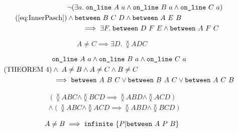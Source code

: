 \begin{equation}
  \tag{\ref{eq:InnerPasch}}
  \begin{split}
    &\Triangle{a}{A}{B}{C}\\ & \wedge \between{B}{C}{D} \wedge \between{A}{E}{B}\\ 
    &\qquad\implies \exists F.\; \between{D}{F}{E} \wedge \between{A}{F}{C}
  \end{split}
\end{equation}

\begin{equation}\label{eq:three}\tag{THEOREM~3}
A \neq C \implies \exists D.\; \between{A}{D}{C}
\end{equation}

\begin{equation}\label{eq:four}\tag{THEOREM~4}
  \begin{split}
    &\texttt{on\_line}\ A\ a \wedge \texttt{on\_line}\ B\ a \wedge \texttt{on\_line}\ C\ a \\
    &\wedge\; A \neq B \wedge A \neq C \wedge B \neq C\\
    &\implies \texttt{between}\ A\ B\ C \vee \texttt{between}\ B\ A\ C \vee \texttt{between}\ A\ C\ B
  \end{split}
\end{equation}

\begin{equation}\label{eq:five}\tag{THEOREM~5}
  \begin{split}
    &(\between{A}{B}{C} \wedge \between{B}{C}{D} \implies \between{A}{B}{D} \wedge \between{A}{C}{D})\\
    &\wedge(\between{A}{B}{C} \wedge \between{A}{C}{D} \implies \between{A}{B}{D} \wedge \between{B}{C}{D})
  \end{split}
\end{equation}

\begin{equation*}
  A \neq B \implies \texttt{infinite}\ \{ P \vert \texttt{between}\ A\ P\ B \}
\end{equation*}

